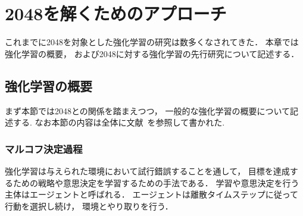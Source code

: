 \chapter{2048を解くためのアプローチ}
\label{chap:rl}
これまでに2048を対象とした強化学習の研究は数多くなされてきた． 
本章では強化学習の概要， および2048に対する強化学習の先行研究について記述する．

\section{強化学習の概要}
\label{sec:rl_general}
まず本節では2048との関係を踏まえつつ， 一般的な強化学習の概要について記述する.
なお本節の内容は全体に文献~\cite{Sutton1998}を参照して書かれた.

\subsection{マルコフ決定過程}
\label{subsec:mdp}
強化学習は与えられた環境において試行錯誤することを通して， 目標を達成するための戦略や意思決定を学習するための手法である．
学習や意思決定を行う主体はエージェントと呼ばれる．
エージェントは離散タイムステップに従って行動を選択し続け， 環境とやり取りを行う．

